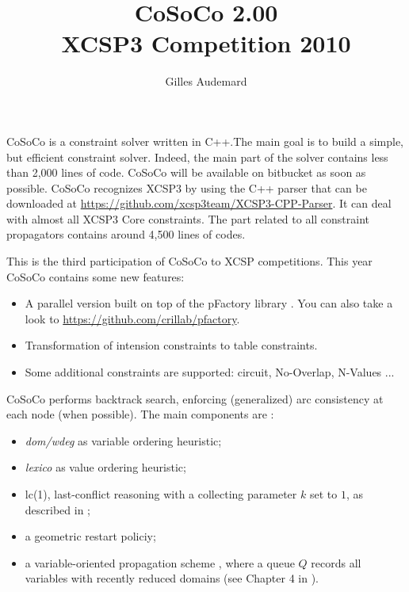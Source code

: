 \documentclass{llncs}
\newcommand{\h}[1]{\textit{#1}} %
\begin{document}
\pagestyle{empty}


\title{CoSoCo 2.00\\ {\small XCSP3 Competition 2010}}

\author{Gilles Audemard}



\maketitle




\bigskip\bigskip\bigskip CoSoCo is a constraint solver written in
C++.The main goal is to build
a simple, but efficient constraint solver. Indeed, the main part of
the solver contains less than 2,000 lines of code. CoSoCo will be
available on bitbucket as soon as possible. CoSoCo recognizes XCSP3
\cite{BLPP_xcsp3} by using the C++ parser that can be downloaded at
\href{https://github.com/xcsp3team/XCSP3-CPP-Parser}{https://github.com/xcsp3team/XCSP3-CPP-Parser}. It
can deal with almost all XCSP3 Core constraints. The part related to
all constraint propagators contains around 4,500 lines of codes.

 This is the third participation of CoSoCo to XCSP competitions. 
This year CoSoCo contains some new features: 
\begin{itemize}
\item A parallel version built on top of the pFactory library
  \cite{pfactory}. You can also take a look to \url{https://github.com/crillab/pfactory}.
\item Transformation of intension constraints to table constraints.
\item Some additional constraints are supported: circuit, No-Overlap,
  N-Values ...
\end{itemize}

\bigskip
CoSoCo performs backtrack search, enforcing (generalized) arc consistency at each node (when possible).  
The main components are :
\begin{itemize}
\item \h{dom/wdeg} \cite{BHLS_boosting} as variable ordering heuristic;
\item \h{lexico} as value ordering heuristic;
\item lc(1), last-conflict reasoning with a collecting parameter $k$ set to $1$, as described in \cite{LSTV_reasonning};
\item a geometric restart policiy;
\item a variable-oriented propagation scheme \cite{G_relational}, where a queue $Q$ records all variables with recently reduced domains (see Chapter 4 in \cite{L_constraint}).
\end{itemize}
  
\end{document}
